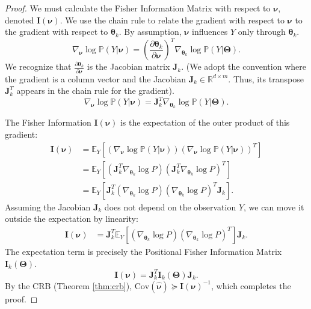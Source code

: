 \documentclass{article}
\theoremstyle{definition}
\begin{document}
\begin{proof}
We must calculate the Fisher Information Matrix with respect to $\boldsymbol{\nu}$, denoted $\mathbf{I}(\boldsymbol{\nu})$. We use the chain rule to relate the gradient with respect to $\boldsymbol{\nu}$ to the gradient with respect to $\boldsymbol{\theta}_k$. By assumption, $\boldsymbol{\nu}$ influences $Y$ only through $\boldsymbol{\theta}_k$.
\begin{equation}
    \nabla_{\boldsymbol{\nu}} \log \mathbb{P}(Y|\boldsymbol{\nu}) = \left( \frac{\partial \boldsymbol{\theta}_k}{\partial \boldsymbol{\nu}} \right)^T \nabla_{\boldsymbol{\theta}_k} \log \mathbb{P}(Y|\mathbf{\Theta}).
\end{equation}
We recognize that $\frac{\partial \boldsymbol{\theta}_k}{\partial \boldsymbol{\nu}}$ is the Jacobian matrix $\mathbf{J}_k$. (We adopt the convention where the gradient is a column vector and the Jacobian $\mathbf{J}_k \in \mathbb{R}^{d \times m}$. Thus, its transpose $\mathbf{J}_k^T$ appears in the chain rule for the gradient).
\begin{equation}
    \nabla_{\boldsymbol{\nu}} \log \mathbb{P}(Y|\boldsymbol{\nu}) = \mathbf{J}_k^T \nabla_{\boldsymbol{\theta}_k} \log \mathbb{P}(Y|\mathbf{\Theta}).
\end{equation}

The Fisher Information $\mathbf{I}(\boldsymbol{\nu})$ is the expectation of the outer product of this gradient:
\begin{align}
    \mathbf{I}(\boldsymbol{\nu}) &= \mathbb{E}_Y \left[ (\nabla_{\boldsymbol{\nu}} \log \mathbb{P}(Y|\boldsymbol{\nu})) (\nabla_{\boldsymbol{\nu}} \log \mathbb{P}(Y|\boldsymbol{\nu}))^T \right] \\
    &= \mathbb{E}_Y \left[ \left(\mathbf{J}_k^T \nabla_{\boldsymbol{\theta}_k} \log P\right) \left(\mathbf{J}_k^T \nabla_{\boldsymbol{\theta}_k} \log P\right)^T \right] \\
    &= \mathbb{E}_Y \left[ \mathbf{J}_k^T (\nabla_{\boldsymbol{\theta}_k} \log P) (\nabla_{\boldsymbol{\theta}_k} \log P)^T \mathbf{J}_k \right].
\end{align}
Assuming the Jacobian $\mathbf{J}_k$ does not depend on the observation $Y$, we can move it outside the expectation by linearity:
\begin{align}
    \mathbf{I}(\boldsymbol{\nu}) &= \mathbf{J}_k^T \mathbb{E}_Y \left[ (\nabla_{\boldsymbol{\theta}_k} \log P) (\nabla_{\boldsymbol{\theta}_k} \log P)^T \right] \mathbf{J}_k.
\end{align}
The expectation term is precisely the Positional Fisher Information Matrix $\mathbf{I}_k(\mathbf{\Theta})$.
\begin{equation}
    \mathbf{I}(\boldsymbol{\nu}) = \mathbf{J}_k^T \mathbf{I}_k(\mathbf{\Theta}) \mathbf{J}_k.
\end{equation}
By the CRB (Theorem \ref{thm:crb}), $\text{Cov}(\hat{\boldsymbol{\nu}}) \succeq \mathbf{I}(\boldsymbol{\nu})^{-1}$, which completes the proof.
\end{proof}
\end{document}

